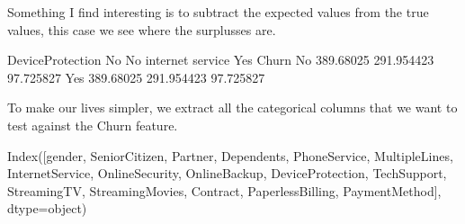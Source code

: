 \documentclass[letterpaper,10pt,english]{jupyterBook}
\begin{document}
\sphinxAtStartPar
Something I find interesting is to subtract the expected values from the true values, this case we see where the surplusses are.

\begin{sphinxVerbatim}[commandchars=\\\{\}]
  
\end{sphinxVerbatim}

\begin{sphinxVerbatim}[commandchars=\\\{\}]
DeviceProtection         No  No internet service        Yes
Churn                                                      
No               \PYGZhy{}389.68025           291.954423  97.725827
Yes               389.68025          \PYGZhy{}291.954423 \PYGZhy{}97.725827
\end{sphinxVerbatim}

\sphinxAtStartPar
To make our lives simpler, we extract all the categorical columns that we want to test against the Churn feature.

\begin{sphinxVerbatim}[commandchars=\\\{\}]
  \PYG{p}{[}   \PYG{p}{]}
\end{sphinxVerbatim}

\begin{sphinxVerbatim}[commandchars=\\\{\}]
Index([\PYGZsq{}gender\PYGZsq{}, \PYGZsq{}SeniorCitizen\PYGZsq{}, \PYGZsq{}Partner\PYGZsq{}, \PYGZsq{}Dependents\PYGZsq{}, \PYGZsq{}PhoneService\PYGZsq{},
       \PYGZsq{}MultipleLines\PYGZsq{}, \PYGZsq{}InternetService\PYGZsq{}, \PYGZsq{}OnlineSecurity\PYGZsq{}, \PYGZsq{}OnlineBackup\PYGZsq{},
       \PYGZsq{}DeviceProtection\PYGZsq{}, \PYGZsq{}TechSupport\PYGZsq{}, \PYGZsq{}StreamingTV\PYGZsq{}, \PYGZsq{}StreamingMovies\PYGZsq{},
       \PYGZsq{}Contract\PYGZsq{}, \PYGZsq{}PaperlessBilling\PYGZsq{}, \PYGZsq{}PaymentMethod\PYGZsq{}],
      dtype=\PYGZsq{}object\PYGZsq{})
\end{sphinxVerbatim}
\end{document}
